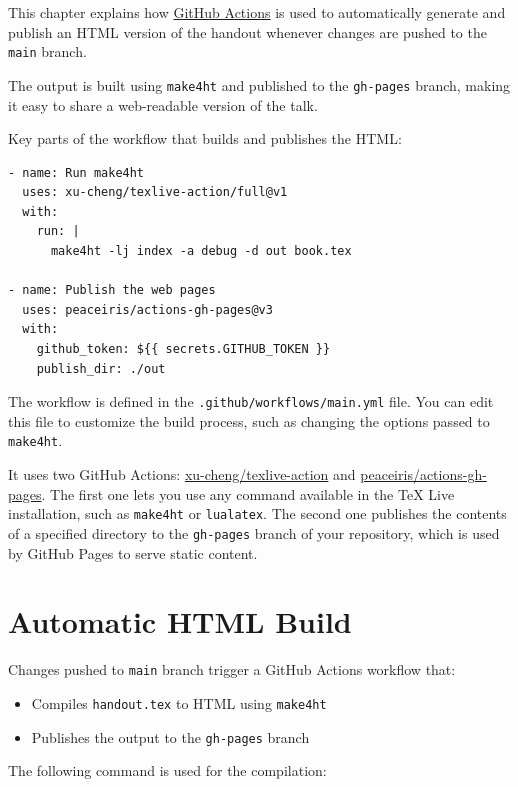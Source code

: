 \documentclass{book}
\begin{document}
This chapter explains how \href{https://docs.github.com/en/actions/writing-workflows/quickstart}{GitHub Actions}
is used to automatically generate and publish an HTML version of the handout whenever changes are pushed to the \texttt{main} branch.

The output is built using \texttt{make4ht} and published to the \texttt{gh-pages} branch,
making it easy to share a web-readable version of the talk.

Key parts of the workflow that builds and publishes the HTML:

\begin{verbatim}
- name: Run make4ht
  uses: xu-cheng/texlive-action/full@v1
  with:
    run: |
      make4ht -lj index -a debug -d out book.tex

- name: Publish the web pages
  uses: peaceiris/actions-gh-pages@v3
  with:
    github_token: ${{ secrets.GITHUB_TOKEN }}
    publish_dir: ./out
\end{verbatim}



The workflow is defined in the \texttt{.github/workflows/main.yml} file.
You can edit this file to customize the build process, such as changing the options passed to \texttt{make4ht}.

It uses two GitHub Actions: \href{https://github.com/xu-cheng/texlive-action}{xu-cheng/texlive-action}
and \href{https://github.com/peaceiris/actions-gh-pages}{peaceiris/actions-gh-pages}.
The first one lets you use any command available in the TeX Live installation, such as \texttt{make4ht} or \texttt{lualatex}.
The second one publishes the contents of a specified directory to the \texttt{gh-pages} branch of your repository,
which is used by GitHub Pages to serve static content.



\section{Automatic HTML Build}
Changes pushed to \texttt{main} branch trigger a GitHub Actions workflow that:

\begin{itemize}
  \item Compiles \texttt{handout.tex} to HTML using \texttt{make4ht}
  \item Publishes the output to the \texttt{gh-pages} branch
\end{itemize}

The following command is used for the compilation:
\end{document}
